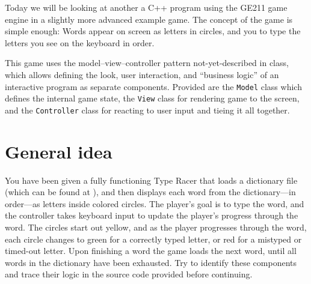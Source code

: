 \documentclass{tufte-handout}
\begin{document}
\maketitle

Today we will be looking at another a C++ program using the GE211 game
engine in a slightly more advanced example game. The concept of the game
is simple enough: Words appear on screen as letters in circles, and you
to type the letters you see on the keyboard in order.

This game uses the model--view--controller pattern not-yet-described in
class, which allows defining the look, user interaction, and ``business
logic'' of an interactive program as separate components. Provided are
the \texttt{Model} class which defines the internal game state, the
\texttt{View} class for rendering game to the screen, and the
\texttt{Controller} class for reacting to user input and tieing it all
together.

\CxxPrelims*

\newpage

\section{General idea}

You have been given a fully functioning Type Racer that loads a
dictionary file (which can be found at
), and then displays each word from the
dictionary---in order---as letters inside colored circles. The player's
goal is to type the word, and the controller takes keyboard input to
update the player's progress through the word. The circles start out
yellow, and as the player progresses through the word, each circle
changes to green for a correctly typed letter, or red for a mistyped or
timed-out letter. Upon finishing a word the game loads the next word,
until all words in the dictionary have been exhausted. Try to identify
these components and trace their logic in the source code provided
before continuing.
\end{document}
